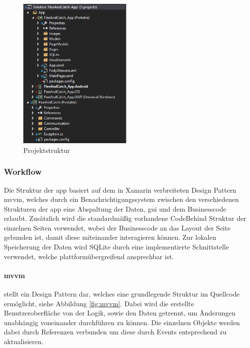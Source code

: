 \begin{figure}[h]
	\begin{center}
		\includegraphics[width=0.5\textwidth]{images/implementation/solution.png}
	\end{center}
	\caption{Projektstruktur}
	\label{fig:solution}
\end{figure}

\newpage
\subsubsection{Workflow} %

Die Struktur der \gls{app} basiert auf dem in Xamarin verbreiteten Design Pattern \acrlong{mvvm}, welches durch ein Benachrichtigungssystem zwischen den verschiedenen Strukturen der \gls{app} eine Abspaltung der Daten, \gls{gui} und dem Businesscode erlaubt. Zusätzlich wird die standardmäßig vorhandene CodeBehind Struktur der einzelnen Seiten verwendet, wobei der Businesscode an das Layout der Seite gebunden ist, damit diese miteinander interagieren können. Zur lokalen Speicherung der Daten wird SQLite durch eine implementierte Schnittstelle verwendet, welche plattformübergreifend ansprechbar ist.

\paragraph{\acrfull{mvvm}}

stellt ein Design Pattern dar, welches eine grundlegende Struktur im Quellcode ermöglicht, siehe Abbildung \eqref{fig:mvvm}. Dabei wird die erstellte Benutzeroberfläche von der Logik, sowie den Daten getrennt, um Änderungen unabhängig voneinander durchführen zu können. Die einzelnen Objekte werden dabei durch Referenzen verbunden um diese durch Events entsprechend zu aktualisieren.\\

